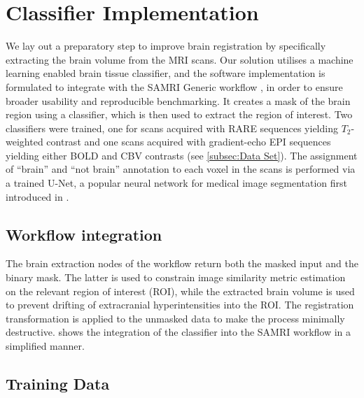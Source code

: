\section{Classifier Implementation}
We lay out a preparatory step to improve brain registration by specifically extracting the brain volume from the MRI scans.
Our solution utilises a machine learning enabled brain tissue classifier, and the software implementation is formulated to integrate with the SAMRI Generic workflow \citep{ioanas_optimized_2019}, in order to ensure broader usability and reproducible benchmarking.
It creates a mask of the brain region using a classifier, which is then used to extract the region of interest.
Two classifiers were trained, one for scans acquired with RARE sequences yielding $T_2$-weighted contrast and one scans acquired with gradient-echo EPI sequences yielding either BOLD \citep{bold} and CBV \citep{cbv} contrasts (see \cref{subsec:Data Set}).
The assignment of “brain” and “not brain” annotation to each voxel in the scans is performed via a trained U-Net, a popular neural network for medical image segmentation first introduced in \cite{ronneberger_u-net:_2015}.

\subsection{Workflow integration}
The brain extraction nodes of the workflow return both the masked input and the binary mask.
The latter is used to constrain image similarity metric estimation on the relevant region of interest (ROI), while the extracted brain volume is used to prevent drifting of extracranial hyperintensities into the ROI.
The registration transformation is applied to the unmasked data to make the process minimally destructive.
 shows the integration of the classifier into the SAMRI workflow in a simplified manner.

\subsection{Training Data}

